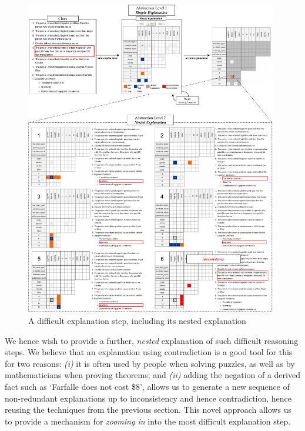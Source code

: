 \begin{figure}[h!]
	\centering
     \includegraphics[width=0.98\textwidth]{figures/aijournal_ijcai_demo-aijournal_other_explanation_2.pdf}
    \caption{A difficult explanation step, including its nested explanation}\label{fig:pasta_diff}
\end{figure}

We hence wish to provide a further, \textit{nested} explanation of such difficult reasoning steps. We believe that an explanation using contradiction is a good tool for this for two reasons: \emph{(i)} it is often used by people when solving puzzles, as well as by mathematicians when proving theorems; and \emph{(ii)} adding the negation of a derived fact such as `Farfalle does not cost \$8', allows us to generate a new sequence of non-redundant explanations up to inconsistency and hence contradiction, hence reusing the techniques from the previous section. 
This novel approach allows us to provide a mechanism for \emph{zooming in} into the most difficult explanation step.




